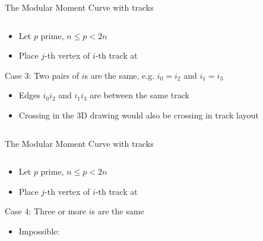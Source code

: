 \documentclass[t]{beamer}
\begin{document}
\begin{frame}{The Modular Moment Curve with tracks}
    \vspace{-0.5cm}
    \begin{columns}
	\begin{column}{0.5\textwidth}
		\begin{itemize}
		    \item <+-> Let $p$ prime, $n\le p<2n$
		    \item
			Place $j$-th vertex of $i$-th track at  \\
			\end{itemize}
			Case 3: Two pairs of $i$s are the same, e.g. $i_0 = i_2$ and $i_1 = i_3$
			\begin{itemize}
			    \item<+-> Edges $i_0i_2$ and $i_1i_3$ are between the same track
			    \item<+-> Crossing in the 3D drawing would also be crossing in track layout
		\end{itemize}
	\end{column}
	    \begin{column}{0.5\textwidth}
		\begin{center}
		\end{center}
	    \end{column}
    \end{columns}
\end{frame}

\begin{frame}{The Modular Moment Curve with tracks}
    \vspace{-0.5cm}
    \begin{columns}
	\begin{column}{0.5\textwidth}
		\begin{itemize}
		    \item <+-> Let $p$ prime, $n\le p<2n$
		    \item
			Place $j$-th vertex of $i$-th track at  \\
			\end{itemize}
			Case 4: Three or more $i$s are the same
			\begin{itemize}
			    \item<+-> Impossible: 
			\end{itemize}
	\end{column}
	    \begin{column}{0.5\textwidth}
		\begin{center}
		\end{center}
	    \end{column}
    \end{columns}
\end{frame}
\end{document}

